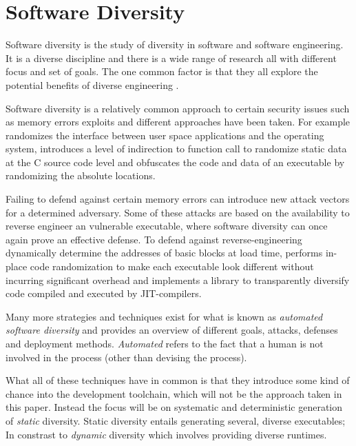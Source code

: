 \section{Software Diversity}

Software diversity is the study of diversity in software and software engineering. It is
a diverse discipline and there is a wide range of research all with different focus and
set of goals. The one common factor is that they all explore the potential benefits of
diverse engineering \cite{survey}.

Software diversity is a relatively common approach to certain security issues such as
memory errors exploits and different approaches have been taken. For example \textcite{os-randomization}
randomizes the interface between user space applications and the operating system, \textcite{mem-exploits}
introduces a level of indirection to function call to randomize static data at the C source
code level and \textcite{add-obfuscation} obfuscates the code and data of an executable by
randomizing the absolute locations.

Failing to defend against certain memory errors can introduce new attack vectors for a
determined adversary. Some of these attacks are based on the availability to reverse engineer
an vulnerable executable, where software diversity can once again prove an effective defense.
To defend against reverse-engineering \textcite{binary-stirring} dynamically determine the
addresses of basic blocks at load time, \textcite{smashing-gadgets} performs in-place code
randomization to make each executable look different without incurring significant overhead
and \textcite{librando} implements a library to transparently diversify code compiled and
executed by JIT-compilers.

Many more strategies and techniques exist for what is known as
\textit{automated software diversity} and \textcite{SoK} provides an overview of different
goals, attacks, defenses and deployment methods. \textit{Automated} refers to the fact that
a human is not involved in the process (other than devising the process).


What all of these techniques have in common is that they introduce some kind of chance into
the development toolchain, which will not be the approach taken in this paper. Instead
the focus will be on systematic and deterministic generation of \textit{static} diversity.
Static diversity entails generating several, diverse executables; In constrast to
\textit{dynamic} diversity which involves providing diverse runtimes\cite{survey}.

